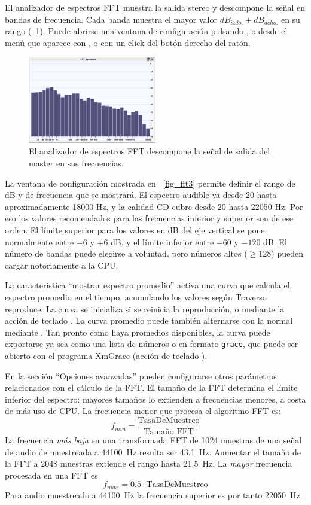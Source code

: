 El analizador de espectros FFT muestra la salida stereo y descompone la señal en bandas de frecuencia. Cada banda muestra el mayor valor $dB_{izdo.} + dB_{dcho.}$ en su rango (\FigB\ \ref{fig_fft1}). Puede abrirse una ventana de configuración pulsando , o desde el menú que aparece con , o con un click del botón derecho del ratón.

\begin{figure}
	\centering
	\includegraphics[width=0.5\textwidth]{../images/fft1.png}
	\caption{El  analizador de espectros FFT descompone la señal de salida del master en sus frecuencias.}
	\label{fig_fft1}
\end{figure}

La ventana de configuración mostrada en \FigT\ \ref{fig_fft3} permite definir el rango de dB y de frecuencia que se mostrará. El espectro audible va desde 20 hasta aproximadamente 18000 Hz, y la calidad CD cubre desde 20 hasta 22050 Hz. Por eso los valores recomendados para las frecuencias inferior y superior son de ese orden. El límite superior para los valores en dB del eje vertical se pone normalmente entre $-6$ y $+6$ dB, y el límite inferior entre $-60$ y $-120$ dB. El número de bandas puede elegirse a voluntad, pero números altos ($\geq 128$) pueden cargar notoriamente a la CPU.

La característica ``mostrar espectro promedio'' activa una curva que calcula el espectro promedio en el tiempo, acumulando los valores según Traverso reproduce. La curva se inicializa si se reinicia la reproducción, o mediante la acción de teclado . La curva promedio puede también alternarse con la normal mediante . Tan pronto como haya promedios disponibles, la curva puede exportarse ya sea como una lista de números o en formato \texttt{grace}, que puede ser abierto con el programa XmGrace (acción de teclado ).

En la sección ``Opciones avanzadas'' pueden configurarse otros parámetros relacionados con el cálculo de la FFT. El tamaño de la FFT determina el límite inferior del espectro: mayores tamaños lo extienden a frecuencias menores, a costa de más uso de CPU. La frecuencia menor que procesa el algoritmo FFT es:
\[
f_{min} = \frac{\textrm{TasaDeMuestreo}}{\textrm{Tamaño FFT}}
\]
La frecuencia \emph{más baja} en una transformada FFT de 1024 muestras de una señal de audio de muestreada a 44100~Hz resulta ser 43.1~Hz. Aumentar el tamaño de la FFT a 2048 muestras extiende el rango hasta 21.5~Hz. La \emph{mayor} frecuencia procesada en una FFT es
\[
f_{max} = 0.5 \cdot \textrm{TasaDeMuestreo}
\]
Para audio muestreado a 44100~Hz la frecuencia superior es por tanto 22050~Hz.

